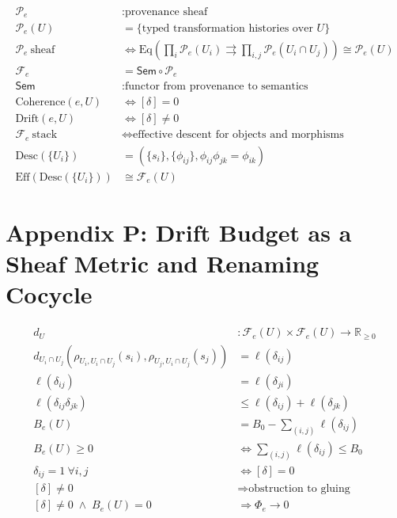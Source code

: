 \documentclass[11pt,oneside]{article}
\begin{document}
\begin{align}
\mathcal{P}_e &: \text{provenance sheaf} \\[6pt]
\mathcal{P}_e(U) &=
\{\text{typed transformation histories over } U\}
\\[12pt]

\mathcal{P}_e \ \text{sheaf}
&\Longleftrightarrow
\mathrm{Eq}\!\left(
\prod_i \mathcal{P}_e(U_i)
\rightrightarrows
\prod_{i,j}\mathcal{P}_e(U_i\cap U_j)
\right)
\cong
\mathcal{P}_e(U)
\\[16pt]

\mathcal{F}_e
&=
\mathsf{Sem}\circ \mathcal{P}_e
\\[10pt]

\mathsf{Sem} &: \text{functor from provenance to semantics} \\[14pt]

\text{Coherence}(e,U)
&\Longleftrightarrow
[\delta]=0
\\[14pt]

\text{Drift}(e,U)
&\Longleftrightarrow
[\delta]\neq 0
\\[16pt]

\mathcal{F}_e \ \text{stack}
&\Longleftrightarrow
\text{effective descent for objects and morphisms}
\\[10pt]

\mathrm{Desc}\!\left(\{U_i\}\right)
&=
\left(
\{s_i\},\{\phi_{ij}\},\phi_{ij}\phi_{jk}=\phi_{ik}
\right)
\\[12pt]

\mathrm{Eff}\!\left(\mathrm{Desc}(\{U_i\})\right)
&\cong
\mathcal{F}_e(U)
\end{align}

\section{Appendix P: Drift Budget as a Sheaf Metric and Renaming Cocycle}

\begin{align}
d_U &: \mathcal{F}_e(U)\times \mathcal{F}_e(U) \to \mathbb{R}_{\ge 0}
\\[10pt]

d_{U_i\cap U_j}\!\left(
\rho_{U_i,U_i\cap U_j}(s_i),
\rho_{U_j,U_i\cap U_j}(s_j)
\right)
&=
\ell(\delta_{ij})
\\[12pt]

\ell(\delta_{ij})
&=
\ell(\delta_{ji})
\\[10pt]

\ell(\delta_{ij}\delta_{jk})
&\le
\ell(\delta_{ij})+\ell(\delta_{jk})
\\[14pt]

B_e(U)
&=
B_0 - \sum_{(i,j)} \ell(\delta_{ij})
\\[12pt]

B_e(U)\ge 0
&\iff
\sum_{(i,j)} \ell(\delta_{ij}) \le B_0
\\[14pt]

\delta_{ij}=1\ \forall i,j
&\iff
[\delta]=0
\\[12pt]

[\delta]\neq 0
&\Rightarrow
\text{obstruction to gluing}
\\[12pt]

[\delta]\neq 0 \;\wedge\; B_e(U)=0
&\Rightarrow
\Phi_e \to 0
\end{align}
\end{document}

